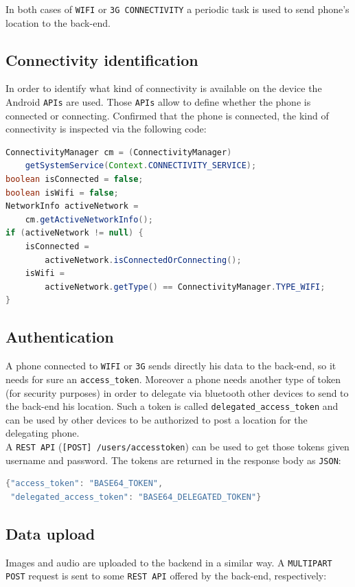 \documentclass[conference, 11pt]{IEEEtran}
\begin{document}
In both cases of \texttt{WIFI} or \texttt{3G CONNECTIVITY} a periodic task is used to send phone's location to the back-end.

\subsection{\textbf{Connectivity identification}}
In order to identify what kind of connectivity is available on the device the Android \texttt{APIs} are used. Those \texttt{APIs} allow to define whether the phone is connected or connecting. Confirmed that the phone is connected, the kind of connectivity is inspected via the following code:

\begin{lstlisting}[language=Java, caption=Java code to define connectivity type]
ConnectivityManager cm = (ConnectivityManager)
	getSystemService(Context.CONNECTIVITY_SERVICE);
boolean isConnected = false;
boolean isWifi = false;
NetworkInfo activeNetwork = 
	cm.getActiveNetworkInfo();
if (activeNetwork != null) {
	isConnected = 
		activeNetwork.isConnectedOrConnecting();
	isWifi = 
		activeNetwork.getType() == ConnectivityManager.TYPE_WIFI;
}
\end{lstlisting}

\subsection{\textbf{Authentication}}
A phone connected to \texttt{WIFI} or \texttt{3G} sends directly his data to the back-end, so it needs for sure an \texttt{access\_token}. Moreover a phone needs another type of token (for security purposes) in order to delegate via bluetooth other devices to send to the back-end his location. Such a token is called \texttt{delegated\_access\_token} and can be used by other devices to be authorized to post a location for the delegating phone.\\
A \texttt{REST API} (\texttt{[POST] /users/accesstoken}) can be used to get those tokens given username and password. The tokens are returned in the response body as \texttt{JSON}:

\begin{lstlisting}[language=Java, caption=Response body containing tokens]
{"access_token": "BASE64_TOKEN",
 "delegated_access_token": "BASE64_DELEGATED_TOKEN"}
\end{lstlisting}

\subsection{\textbf{Data upload}}
Images and audio are uploaded to the backend in a similar way. A \texttt{MULTIPART POST} request is sent to some \texttt{REST API} offered by the back-end, respectively:
\end{document}

